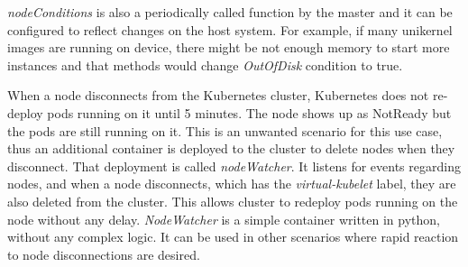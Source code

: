 \textit{nodeConditions} is also a periodically called function by the master and it can be configured to reflect changes on the host system. For example, if many unikernel images are running on device, there might be not enough memory to start more instances and that methods would change \textit{OutOfDisk} condition to true.

\pagebreak
When a node disconnects from the Kubernetes cluster, Kubernetes does not re-deploy pods running on it until 5 minutes. The node shows up as NotReady but the pods are still running on it. This is an unwanted scenario for this use case, thus an additional container is deployed to the cluster to delete nodes when they disconnect. That deployment is called \textit{nodeWatcher}. It listens for events regarding nodes, and when a node disconnects, which has the \textit{virtual-kubelet} label, they are also deleted from the cluster. This allows cluster to redeploy pods running on the node without any delay. \textit{NodeWatcher} is a simple container written in python, without any complex logic. It can be used in other scenarios where rapid reaction to node disconnections are desired.
